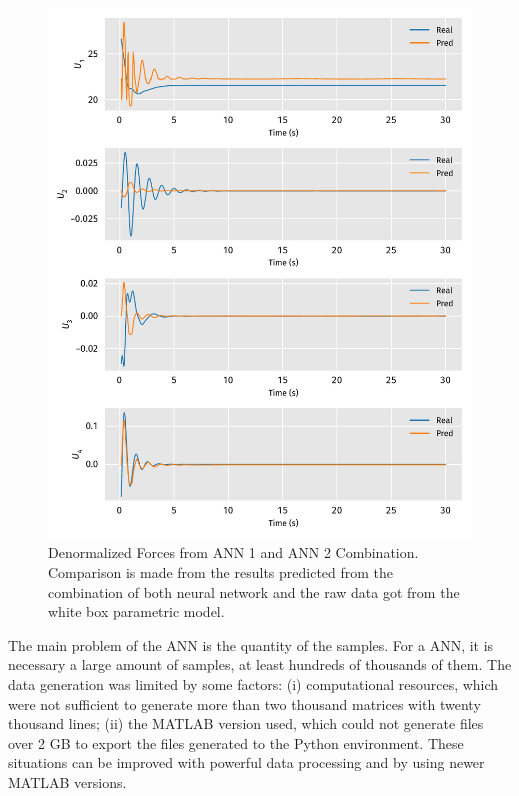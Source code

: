 \begin{figure}[!htb]
    \centering
    \caption[Denormalized Forces from ANN 1 and ANN 2 Combination]{Denormalized Forces from ANN 1 and ANN 2 Combination. Comparison is made from the results predicted from the combination of both neural network and the raw data got from the white box parametric model.}
    \includegraphics{../codes/figures/comparison.pdf}    

    \label{fig:forces_denormalized}
\end{figure}

The main problem of the ANN is the quantity of the samples.
For a ANN, it is necessary a large amount of samples, at least hundreds of thousands of them. 
The data generation was limited by some factors: (i) computational resources, which were not sufficient to generate more than two thousand matrices with twenty thousand lines; (ii) the MATLAB version used, which could not generate files over 2 GB to export the files generated to the Python environment. These situations can be improved with powerful data processing and by using newer MATLAB versions.

